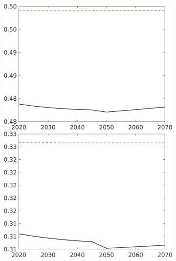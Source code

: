 \begin{figure}[h!!]
\begin{subfigure}{1\textwidth}
\begin{minipage}[]{0.32\textwidth}
	\end{minipage}	
	\begin{minipage}[]{0.32\textwidth}
		\includegraphics[width=1\textwidth]{../../codding_model/own_basedOnFried/optimalPol_010922_revision/figures/all_13Sept22_Tplus30/hh_LFCompSP_T_regime0_spillover0_noskill0_sep0_xgrowth0_PV1_etaa0.79_lgd0.png}
	\end{minipage}	
	\begin{minipage}[]{0.32\textwidth}
		\includegraphics[width=1\textwidth]{../../codding_model/own_basedOnFried/optimalPol_010922_revision/figures/all_13Sept22_Tplus30/hl_LFCompSP_T_regime0_spillover0_noskill0_sep0_xgrowth0_PV1_etaa0.79_lgd0.png}
	\end{minipage}	
\end{subfigure}	
\end{figure}
\clearpage

